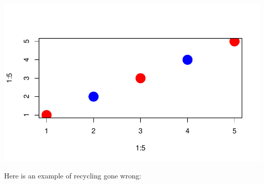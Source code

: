 \documentclass[]{book}
\theoremstyle{definition}
\theoremstyle{definition}
\theoremstyle{definition}
\theoremstyle{remark}
\begin{document}
\begin{center}\includegraphics[width=0.7\linewidth]{DS4PS-I_files/figure-latex/unnamed-chunk-76-1} \end{center}

Here is an example of recycling gone wrong:
\end{document}
